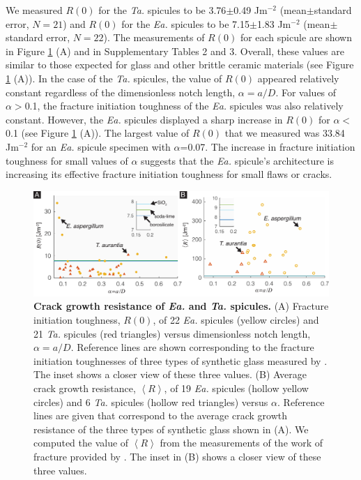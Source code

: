 \documentclass[12pt,onecolumn]{article}
\makeatletter
\newcommand{\TA}{\textit{Ta.\@}\xspace}
\newcommand{\EA}{\textit{Ea.\@}\xspace}
\makeatother
\begin{document}
\begin{bibunit}
We measured $R(0)$ for the \TA spicules to be 3.76$\pm$0.49 Jm$^{-2}$ (mean$\pm$standard error, $N=21$) and $R(0)$ for the \EA spicules to be 7.15$\pm$1.83 Jm$^{-2}$ (mean$\pm$standard error, $N=22$). The measurements of $R(0)$ for each spicule are shown in Figure \ref{fig:R} (A) and in Supplementary Tables 2 and 3. Overall, these values are similar to those expected for glass and other brittle ceramic materials (see Figure \ref{fig:R} (A)). In the case of the \TA spicules, the value of $R(0)$ appeared relatively constant regardless of the dimensionless notch length, $\alpha=a/D$. For values of $\alpha>$0.1, the fracture initiation toughness of the \EA spicules was also relatively constant. However, the \EA spicules displayed a sharp increase in $R(0)$ for $\alpha<$0.1 (see Figure \ref{fig:R} (A)). The largest value of $R(0)$ that we measured was 33.84 Jm$^{-2}$ for an \EA spicule specimen with $\alpha$=0.07. The increase in fracture initiation toughness for small values of $\alpha$ suggests that the \EA spicule's architecture is increasing its effective fracture initiation toughness for small flaws or cracks.
%
			\begin{figure}[ht!]
			\centering
			\includegraphics[width=\textwidth]{../Figures/FigureR/Figure5_V8.pdf}
			\caption{\textbf{Crack growth resistance of \EA and \TA spicules.} (A) Fracture initiation toughness, $R(0)$, of 22 \EA spicules (yellow circles) and 21 \TA spicules (red triangles) versus dimensionless notch length, $\alpha=a/D$. Reference lines are shown corresponding to the fracture initiation toughnesses of three types of synthetic glass measured by \cite{wiederhorn1969fracture}. The inset shows a closer view of these three values. (B) Average crack growth resistance, $\left< R \right>$, of 19 \EA spicules (hollow yellow circles) and 6 \TA spicules (hollow red triangles) versus $\alpha$.  Reference lines are given that correspond to the average crack growth resistance of the three types of synthetic glass shown in (A). We computed the value of $\left< R \right>$ from the measurements of the work of fracture provided by \cite{wiederhorn1969fracture}. The inset in (B) shows a closer view of these three values.}
			\label{fig:R}
			\end{figure}


\end{bibunit}
\end{document}
